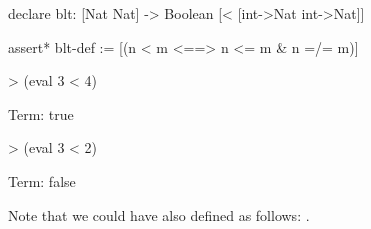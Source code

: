 %
%
\begin{tcAthena}
declare blt: [Nat Nat] -> Boolean [< [int->Nat int->Nat]]

assert* blt-def := [(n < m <==> n <= m & n =/= m)]

> (eval 3 < 4)

Term: true

> (eval 3 < 2)

Term: false
\end{tcAthena}
Note that we could have also defined  as follows: .
